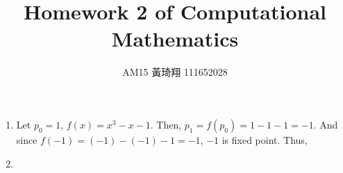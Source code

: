 \documentclass[12pt]{article}
\title{Homework 2 of Computational Mathematics}
\author{AM15 黃琦翔 111652028}
\begin{document}
\maketitle
\begin{enumerate}
    \item Let $p_0= 1$, $f(x) = x^3 - x - 1$. 
    Then, $p_1 = f(p_0) = 1 - 1 - 1 = -1$.
    And since $f(-1) = (-1) - (-1) - 1 = -1$, 
    $-1$ is fixed point.
    Thus, 

    \item 
\end{enumerate}
\end{document}
